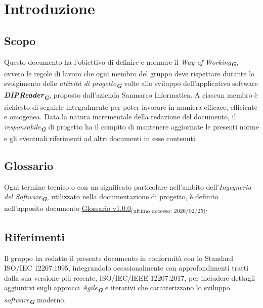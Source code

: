 \documentclass[a4paper,12pt]{article}
\newcommand{\glossario}[1]{\textit{#1}\textsubscript{\textbf{\textit{\textcolor{lightblack}{G}}}}}
\newcommand{\ped}[1]{\textsubscript{#1}}
\begin{document}
\tableofcontents
\listoffigures


\section{Introduzione}

\subsection{Scopo}
Questo documento ha l'obiettivo di definire e normare il \glossario{Way of
    Working}, ovvero le regole di lavoro che ogni membro del gruppo deve rispettare
durante lo svolgimento delle \glossario{attività di progetto} volte allo
sviluppo dell'applicativo software \glossario{\textbf{DIPReader}}, proposto
dall'azienda Sanmarco Informatica. A ciascun membro è richiesto di
seguirle integralmente per poter lavorare in maniera efficace, efficiente e omogenea. 
Data la natura incrementale della redazione del documento, il \glossario{responsabile} di progetto ha il compito di
mantenere aggiornate le presenti norme e gli eventuali riferimenti ad altri
documenti in esse contenuti.
\subsection{Glossario}
Ogni termine tecnico o con un significato particolare nell'ambito
dell'\glossario{Ingegneria del Software}, utilizzato nella documentazione di
progetto, è definito nell'apposito documento
\href{https://7-zpus.github.io/Docs/assets/pdf/Glossario.pdf}{\ul{Glossario
        v1.0.0}}\ped{(ultimo accesso: 2026/02/25)}.
\subsection{Riferimenti}
Il gruppo ha redatto il presente documento in conformità con lo
Standard ISO/IEC 12207:1995, integrandolo occasionalmente con
approfondimenti tratti dalla sua versione più recente, ISO/IEC/IEEE
12207:2017, per includere dettagli aggiuntivi sugli approcci
\glossario{\textit{Agile}} e iterativi che caratterizzano lo
sviluppo \glossario{software} moderno.
\end{document}

